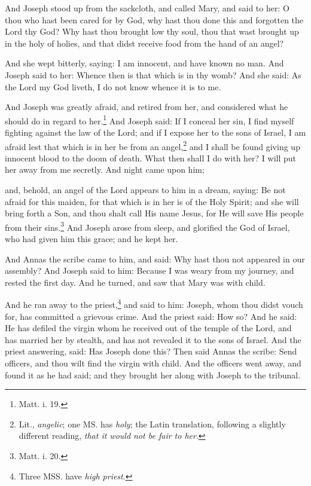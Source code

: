 \pend\pstart
And Joseph stood up from the sackcloth, and called Mary, and said to her: O thou who hast been cared for by God, why hast thou done this and forgotten the Lord thy God? Why hast thou brought low thy soul, thou that wast brought up in the holy of holies, and that didst receive food from the hand of an angel?

\pend\pstart
And she wept bitterly, saying: I am innocent, and have known no man. And Joseph said to her: Whence then is that which is in thy womb? And she said: As the Lord my God liveth, I do not know whence it is to me.

\pend\pstart
{}

\pend\setcounter{pstartR}{1}\pstart
And Joseph was greatly afraid, and retired from her, and considered what he should do in regard to her.\footnote{Matt. i. 19.} And Joseph said: If I conceal her sin, I find myself fighting against the law of the Lord; and if I expose her to the sons of Israel, I am afraid lest that which is in her be from an angel,\footnote{Lit., \textit{angelic}; one MS. has \textit{holy}; the Latin translation, following a slightly different reading, \textit{that it would not be fair to her}.} and I shall be found giving up innocent blood to the doom of death. What then shall I do with her? I will put her away from me secretly. And night came upon him;

\pend\pstart
and, behold, an angel of the Lord appears to him in a dream, saying: Be not afraid for this maiden, for that which is in her is of the Holy Spirit; and she will bring forth a Son, and thou shalt call His name Jesus, for He will save His people from their sins.\footnote{Matt. i. 20.} And Joseph arose from sleep, and glorified the God of Israel, who had given him this grace; and he kept her.

\pend\pstart
{}

\pend\setcounter{pstartR}{1}\pstart
And Annas the scribe came to him, and said: Why hast thou not appeared in our assembly? And Joseph said to him: Because I was weary from my journey, and rested the first day. And he turned, and saw that Mary was with child.

\pend\pstart
And he ran away to the priest,\footnote{Three MSS. have \textit{high priest}.} and said to him: Joseph, whom thou didst vouch for, has committed a grievous crime. And the priest said: How so? And he said: He has defiled the virgin whom he received out of the temple of the Lord, and has married her by stealth, and has not revealed it to the sons of Israel. And the priest answering, said: Has Joseph done this? Then said Annas the scribe: Send officers, and thou wilt find the virgin with child. And the officers went away, and found it as he had said; and they brought her along with Joseph to the tribunal.

